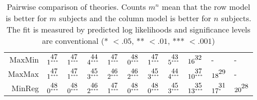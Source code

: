 \begin{table}[!htb]
\begin{tabular}{rllllllllll}
  MaxMin & $1^{\stackrel{\textstyle47\hfill}{\scriptscriptstyle***\hfill}}$ & $1^{\stackrel{\textstyle47\hfill}{\scriptscriptstyle***\hfill}}$ & $4^{\stackrel{\textstyle44\hfill}{\scriptscriptstyle***\hfill}}$ & $1^{\stackrel{\textstyle47\hfill}{\scriptscriptstyle***\hfill}}$ & $0^{\stackrel{\textstyle48\hfill}{\scriptscriptstyle***\hfill}}$ & $1^{\stackrel{\textstyle47\hfill}{\scriptscriptstyle***\hfill}}$ & $5^{\stackrel{\textstyle43\hfill}{\scriptscriptstyle***\hfill}}$ & $16^{\stackrel{\textstyle32\hfill}{\scriptscriptstyle\hfill}}$ & - & - \\ 
  MaxMax & $1^{\stackrel{\textstyle47\hfill}{\scriptscriptstyle***\hfill}}$ & $1^{\stackrel{\textstyle47\hfill}{\scriptscriptstyle***\hfill}}$ & $3^{\stackrel{\textstyle45\hfill}{\scriptscriptstyle***\hfill}}$ & $2^{\stackrel{\textstyle46\hfill}{\scriptscriptstyle***\hfill}}$ & $2^{\stackrel{\textstyle46\hfill}{\scriptscriptstyle***\hfill}}$ & $3^{\stackrel{\textstyle45\hfill}{\scriptscriptstyle***\hfill}}$ & $4^{\stackrel{\textstyle44\hfill}{\scriptscriptstyle***\hfill}}$ & $10^{\stackrel{\textstyle37\hfill}{\scriptscriptstyle***\hfill}}$ & $18^{\stackrel{\textstyle29\hfill}{\scriptscriptstyle\hfill}}$ & - \\ 
  MinReg & $0^{\stackrel{\textstyle48\hfill}{\scriptscriptstyle***\hfill}}$ & $0^{\stackrel{\textstyle48\hfill}{\scriptscriptstyle***\hfill}}$ & $2^{\stackrel{\textstyle46\hfill}{\scriptscriptstyle***\hfill}}$ & $1^{\stackrel{\textstyle47\hfill}{\scriptscriptstyle***\hfill}}$ & $0^{\stackrel{\textstyle48\hfill}{\scriptscriptstyle***\hfill}}$ & $0^{\stackrel{\textstyle48\hfill}{\scriptscriptstyle***\hfill}}$ & $3^{\stackrel{\textstyle45\hfill}{\scriptscriptstyle***\hfill}}$ & $13^{\stackrel{\textstyle35\hfill}{\scriptscriptstyle***\hfill}}$ & $17^{\stackrel{\textstyle31\hfill}{\scriptscriptstyle*\hfill}}$ & $20^{\stackrel{\textstyle28\hfill}{\scriptscriptstyle\hfill}}$ \\ 
   \hline
\end{tabular}
\caption{Pairwise comparison of theories. Counts $m^{\textstyle n}$ mean that the row model is better for $m$ subjects and the column model is better for $n$ subjects. The fit is measured by predicted log likelihoods and significance levels are conventional (* $< .05$, ** $< .01$, *** $< .001$)} 
\label{table3_sig_counts_all_models}
\end{table}
